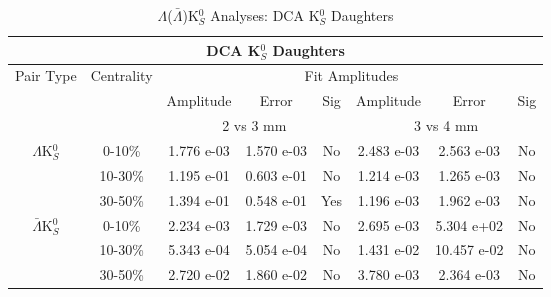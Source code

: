 \documentclass[../AnalysisNoteJBuxton.tex]{subfiles}
\begin{document}
\begin{table}
 \centering
 \begin{tabular}{|c|c|c|c|c||c|c|c|}
  \multicolumn{8}{c}{DCA K$^{0}_{S}$ Daughters} \\
  \hline
  \multirow{3}{*}{Pair Type} & \multirow{3}{*}{Centrality} & \multicolumn{6}{c|}{Fit Amplitudes} \\
  \cline{3-8}
   & & Amplitude & Error & Sig & Amplitude & Error & Sig \\  
  \cline{3-8}
   & & \multicolumn{3}{c||}{2 vs 3 mm} & \multicolumn{3}{c|}{3 vs 4 mm} \\  
  \hline  
  \multirow{3}{*}{$\Lambda$K$^{0}_{S}$}  
   &  0-10\% & 1.776 e-03 & 1.570 e-03 & No & 2.483 e-03 & 2.563 e-03 & No \\
   & 10-30\% & 1.195 e-01 & 0.603 e-01 & No & 1.214 e-03 & 1.265 e-03 & No \\
   & 30-50\% & 1.394 e-01 & 0.548 e-01 & Yes & 1.196 e-03 & 1.962 e-03 & No \\
  \hline  
  \multirow{3}{*}{$\bar{\Lambda}$K$^{0}_{S}$}  
   &  0-10\% & 2.234 e-03 & 1.729 e-03 & No & 2.695 e-03 & 5.304 e+02 & No \\
   & 10-30\% & 5.343 e-04 & 5.054 e-04 & No & 1.431 e-02 & 10.457 e-02 & No \\
   & 30-50\% & 2.720 e-02 & 1.860 e-02 & No & 3.780 e-03 & 2.364 e-03 & No \\
  \hline
 \end{tabular}
 \caption{$\Lambda$($\bar{\Lambda}$)K$^{0}_{S}$ Analyses: DCA K$^{0}_{S}$ Daughters}
 \label{tab:K0DaughtersDcaLamK0}
\end{table}
\end{document}
